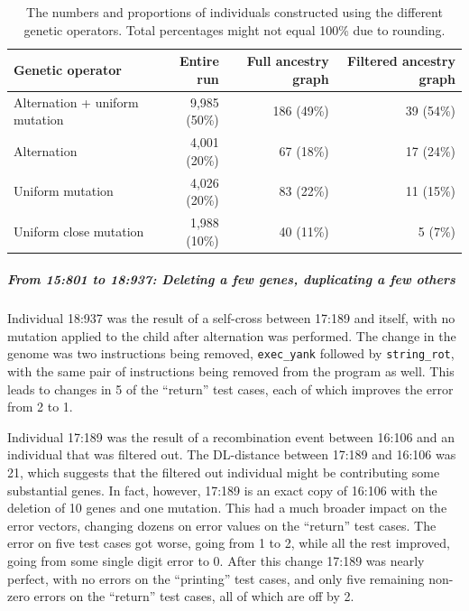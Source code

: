 \begin{table}[t]
	\begin{tabular}{lrrr}
		\textbf{Genetic operator} & \textbf{Entire run} & \; \textbf{Full ancestry graph} & \; \textbf{Filtered ancestry graph} \\ 
		\hline
		Alternation + uniform mutation & 9,985 (50\%) & 186 (49\%) & 39 (54\%) \\ 
		Alternation & 4,001 (20\%) & 67 (18\%) & 17 (24\%) \\ 
		Uniform mutation & 4,026 (20\%) & 83 (22\%) & 11 (15\%) \\ 
		Uniform close mutation & 1,988 (10\%) & 40 (11\%) & 5 (7\%)
	\end{tabular} 
	\caption{The numbers and proportions of individuals constructed using
		the different genetic operators. Total percentages might not equal 100\% due to rounding.}
	\label{tab:operatorCounts}
\end{table}


\subparagraph{From 15:801 to 18:937: Deleting a few genes, duplicating a few others}


Individual 18:937 was the result of a self-cross between 17:189 and itself,
with no mutation applied to the child after alternation was performed. The
change in the genome was two instructions being removed, 
\texttt{exec\_yank} followed by \texttt{string\_rot}, with the same pair of
instructions being removed from the program as well. This leads to changes
in 5 of the ``return'' test cases, each of which improves the error 
from 2 to 1.

Individual 17:189 was the result of a recombination event between 16:106
and an individual that was filtered out. The DL-distance between 17:189
and 16:106 was 21, which suggests that the filtered out individual might
be contributing some substantial genes. In fact, however, 17:189 is an
exact copy of 16:106 with the deletion of 10 genes and one mutation. This
had a much broader impact on the error vectors, changing dozens on error
values on the ``return'' test cases. The error on five test cases got worse,
going from 1 to 2, while all the rest improved, going from some single
digit error to 0. After this change 17:189 was nearly perfect, with no errors
on the ``printing'' test cases, and only five remaining non-zero errors on
the ``return'' test cases, all of which are off by 2.

